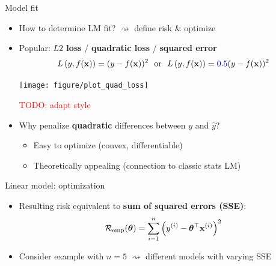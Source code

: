 \documentclass[11pt,compress,t,notes=noshow, xcolor=table]{beamer}
\begin{document}

\begin{frame}{Model fit}

\begin{itemize}
    \item How to determine LM fit? $\rightsquigarrow$ define risk \& optimize
    \item Popular: \textbf{$L2$ loss} / \textbf{quadratic loss} / 
    \textbf{squared error}
    $$L\left(y, f(\mathbf{x})\right) = (y-f(\mathbf{x}))^2 ~~ \text{or} ~~ L\left(y, f(\mathbf{x})\right) = \textcolor{blue}{0.5} (y-f(\mathbf{x}))^2$$
    \begin{minipage}{0.5\textwidth}
        \texttt{[image: figure/plot\_quad\_loss]} 
    \end{minipage}
    \begin{minipage}{0.3\textwidth}
        \footnotesize \raggedright
        \textcolor{red}{\footnotesize TODO: adapt style}
    \end{minipage}
    \item Why penalize \textbf{quadratic} differences between $y$ and $\hat y$?
    \begin{itemize}
        \item Easy to optimize (convex, differentiable)
        \item Theoretically appealing (connection to classic stats LM)
    \end{itemize}
\end{itemize}

\end{frame}


\begin{frame}{Linear model: optimization}

\begin{itemize}
    \item Resulting risk equivalent to 
    \textbf{sum of squared errors (SSE)}:
    $$\mathcal{R}_{\text{emp}}(\bm{\theta}) = \sum\limits_{i=1}^n \left(y^{(i)} - \bm{\theta}^\top \mathbf{x}^{(i)} \right)^2$$
    \item Consider example with $n = 5$ $\rightsquigarrow$ 
    different models with varying SSE
\end{itemize}

\vfill
{}

\end{frame}
\end{document}
